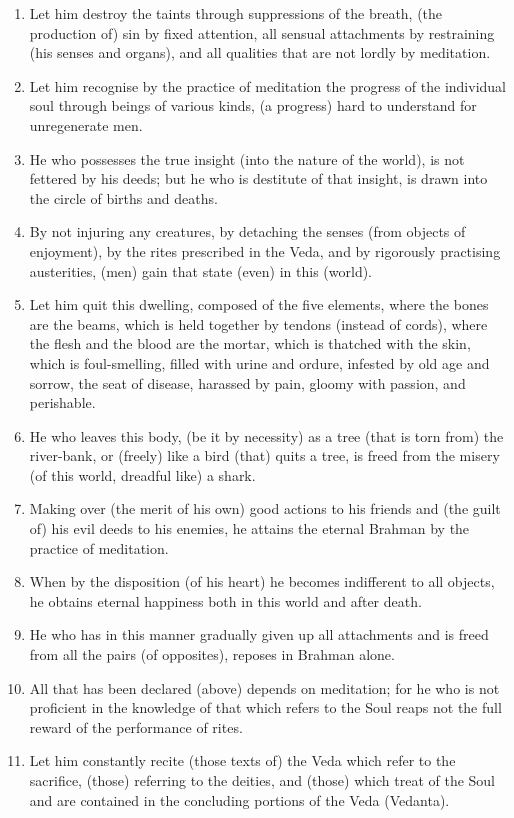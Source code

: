 \begin{enumerate}
\item Let him destroy the taints through suppressions of the breath, (the production of) sin by fixed attention, all sensual attachments by restraining (his senses and organs), and all qualities that are not lordly by meditation.
\item Let him recognise by the practice of meditation the progress of the individual soul through beings of various kinds, (a progress) hard to understand for unregenerate men.
\item He who possesses the true insight (into the nature of the world), is not fettered by his deeds; but he who is destitute of that insight, is drawn into the circle of births and deaths.
\item By not injuring any creatures, by detaching the senses (from objects of enjoyment), by the rites prescribed in the Veda, and by rigorously practising austerities, (men) gain that state (even) in this (world).
\item Let him quit this dwelling, composed of the five elements, where the bones are the beams, which is held together by tendons (instead of cords), where the flesh and the blood are the mortar, which is thatched with the skin, which is foul-smelling, filled with urine and ordure, infested by old age and sorrow, the seat of disease, harassed by pain, gloomy with passion, and perishable.
\item He who leaves this body, (be it by necessity) as a tree (that is torn from) the river-bank, or (freely) like a bird (that) quits a tree, is freed from the misery (of this world, dreadful like) a shark.
\item Making over (the merit of his own) good actions to his friends and (the guilt of) his evil deeds to his enemies, he attains the eternal Brahman by the practice of meditation.
\item When by the disposition (of his heart) he becomes indifferent to all objects, he obtains eternal happiness both in this world and after death.
\item He who has in this manner gradually given up all attachments and is freed from all the pairs (of opposites), reposes in Brahman alone.
\item All that has been declared (above) depends on meditation; for he who is not proficient in the knowledge of that which refers to the Soul reaps not the full reward of the performance of rites.
\item Let him constantly recite (those texts of) the Veda which refer to the sacrifice, (those) referring to the deities, and (those) which treat of the Soul and are contained in the concluding portions of the Veda (Vedanta).

\end{enumerate}
